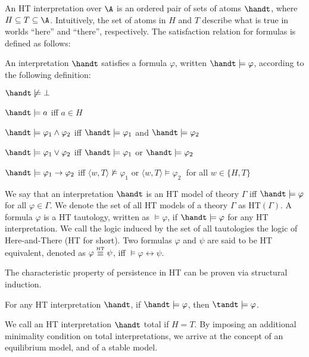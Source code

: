 An HT interpretation over $\A$ is an ordered pair of sets of atoms
$\handt$, where $H \subseteq T \subseteq \A$. Intuitively, the set of
atoms in $H$ and $T$ describe what is true in worlds ``here'' and
``there'', respectively. The satisfaction relation for formulas is
defined as follows:

\begin{definition}[HT satisfaction]
    An interpretation $\handt$ satisfies a formula $\varphi$, written $\handt \models \varphi$, according to the following definition:
    \begin{description}
        \item $\handt \not \models \bot$
        \item $\handt \models a$ iff $a\in H$
        \item $\handt \models \varphi_1 \wedge \varphi_2$ iff $\handt \models \varphi_1$ and  $\handt \models \varphi_2$
        \item $\handt \models \varphi_1 \vee \varphi_2$ iff $\handt \models \varphi_1$ or  $\handt \models \varphi_2$
        \item $\handt \models \varphi_1 \to \varphi_2$ iff $\langle w,T \rangle \not \models \varphi_1$ or  $\langle w,T \rangle \models \varphi_2\;$ for all 
        $w \in \{H,T\}$
    \end{description}
\end{definition}

We say that an interpretation $\handt$ is an HT model of theory
$\Gamma$ iff $\handt \models \varphi$ for all $\varphi \in \Gamma$. We
denote the set of all HT models of a theory $\Gamma$ as
$\text{HT}(\Gamma)$. A formula $\varphi$ is a HT tautology, written as
$\models \varphi$, if $\handt \models \varphi$ for any HT
interpretation. We call the logic induced by the set of all
tautologies the logic of Here-and-There (HT for short). Two formulas
$\varphi$ and $\psi$ are said to be HT equivalent, denoted as
$\varphi \stackrel{\normalfont\mbox{\tiny HT}}{\equiv} \psi$, iff $\models \varphi \leftrightarrow \psi$.

The characteristic property of persistence in HT can be proven via
structural induction.

\begin{proposition}[Persistence]
  For any HT interpretation $\handt$, if $\handt \models \varphi$,
  then $\tandt \models \varphi$.
\end{proposition}



We call an HT interpretation $\handt$ total if $H=T$. By imposing an
additional minimality condition on total interpretations, we arrive at
the concept of an equilibrium model, and of a stable model.

